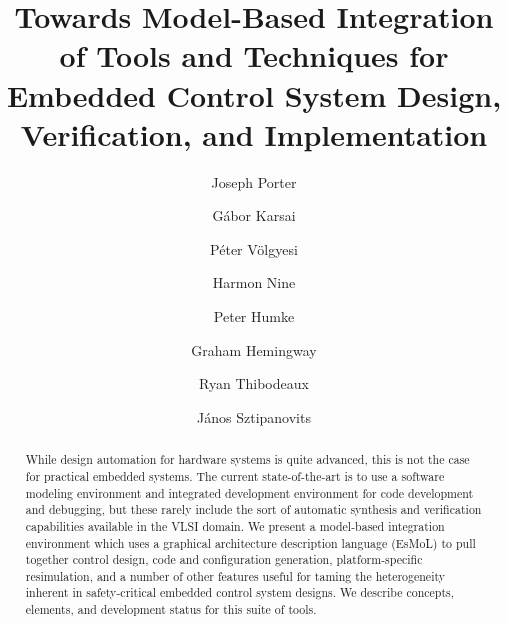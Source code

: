 \documentclass{llncs}
\begin{document}
%
%
\pagestyle{headings}  %
%
%
\mainmatter              %
%
\title{Towards Model-Based Integration of Tools and Techniques for Embedded Control System
Design, Verification, and Implementation}
%
%
\author{Joseph Porter \and G\'{a}bor Karsai \and P\'{e}ter V\"{o}lgyesi \and Harmon Nine \and Peter Humke \and Graham Hemingway \and Ryan Thibodeaux \and J\'{a}nos Sztipanovits}
%
%
%

\maketitle              %

\begin{abstract}
While design automation for hardware systems is quite advanced, this is not the case for practical embedded systems. The current state-of-the-art is to use a software modeling environment and integrated development environment for code development and debugging, but these rarely include the sort of automatic synthesis and verification capabilities available in the VLSI domain. We present a model-based integration environment which uses a graphical architecture description language (EsMoL) to pull together control design, code and configuration generation, platform-specific resimulation, and a number of other features useful for taming the heterogeneity inherent in safety-critical embedded control system designs.  We describe concepts, elements, and development status for this suite of tools.
\end{abstract}
%
\end{document}

